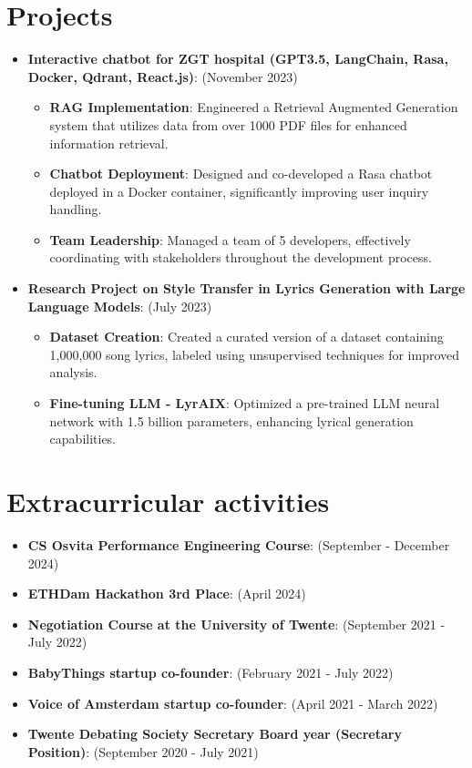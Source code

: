 \documentclass[a4paper,20pt]{article}
\newcommand{\resumeItem}[2]{
  \item\small{
    \textbf{#1}{: #2 \vspace{-2pt}}
  }
}
\newcommand{\resumeSubItem}[2]{\resumeItem{#1}{#2}\vspace{-3pt}}
\newcommand{\resumeSubHeadingListStart}{\begin{itemize}[leftmargin=*]}
\newcommand{\resumeSubHeadingListEnd}{\end{itemize}}
\newcommand{\resumeItemListStart}{\begin{itemize}}
\newcommand{\resumeItemListEnd}{\end{itemize}\vspace{-5pt}}
\begin{document}
\vspace{-5pt}
\section{Projects}
\resumeSubHeadingListStart
\resumeSubItem{Interactive chatbot for ZGT hospital (GPT3.5, LangChain, Rasa, Docker, Qdrant, React.js)}{(November 2023)}
    \resumeItemListStart
        \resumeItem{RAG Implementation}
          {Engineered a Retrieval Augmented Generation system that utilizes data from over 1000 PDF files for enhanced information retrieval.}
        \resumeItem{Chatbot Deployment}
          {Designed and co-developed a Rasa chatbot deployed in a Docker container, significantly improving user inquiry handling.}
        \resumeItem{Team Leadership}{Managed a team of 5 developers, effectively coordinating with stakeholders throughout the development process.}
	\resumeItemListEnd
\resumeSubItem{Research Project on Style Transfer in Lyrics Generation with Large Language Models}{(July 2023)}
\resumeItemListStart
        \resumeItem{Dataset Creation}
          {Created a curated version of a dataset containing 1,000,000 song lyrics, labeled using unsupervised techniques for improved analysis.}
        \resumeItem{Fine-tuning LLM - LyrAIX}
          {Optimized a pre-trained LLM neural network with 1.5 billion parameters, enhancing lyrical generation capabilities.}
	\resumeItemListEnd
\resumeSubHeadingListEnd
\vspace{-5pt}

\section{Extracurricular activities}
\resumeSubHeadingListStart
\resumeSubItem{CS Osvita Performance Engineering Course}{(September - December 2024)}
\resumeSubItem{ETHDam Hackathon 3rd Place}{(April 2024)}
\resumeSubItem{Negotiation Course at the University of Twente}{(September 2021 - July 2022)}
\resumeSubItem{BabyThings startup co-founder}{(February 2021 - July 2022)}
\resumeSubItem{Voice of Amsterdam startup co-founder}{(April 2021 - March 2022)}
\resumeSubItem{Twente Debating Society Secretary Board year (Secretary Position)}{(September 2020 - July 2021)}
\resumeSubHeadingListEnd
\vspace{-5pt}
\end{document}
